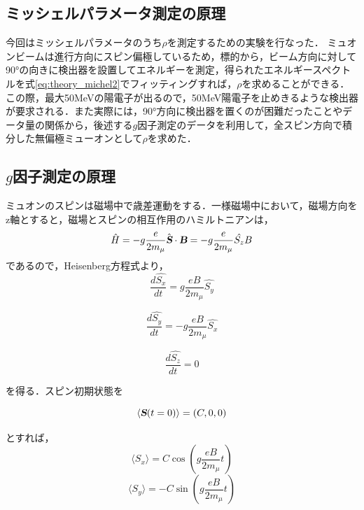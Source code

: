 \subsection{ミッシェルパラメータ測定の原理}
	今回はミッシェルパラメータのうち$\rho$を測定するための実験を行なった．
ミュオンビームは進行方向にスピン偏極しているため，標的から，ビーム方向に対して90°の向きに検出器を設置してエネルギーを測定，得られたエネルギースペクトルを式\eqref{eq:theory_michel2}でフィッティングすれば，$\rho$を求めることができる．この際，最大50MeVの陽電子が出るので，50MeV陽電子を止めきるような検出器が要求される．また実際には，90°方向に検出器を置くのが困難だったことやデータ量の関係から，後述する$g$因子測定のデータを利用して，全スピン方向で積分した無偏極ミューオンとして$\rho$を求めた．
\subsection{$g$因子測定の原理}
ミュオンのスピンは磁場中で歳差運動をする．一様磁場中において，磁場方向をz軸とすると，磁場とスピンの相互作用のハミルトニアンは，
\begin{equation}
\hat{H} = - g \frac{e}{2m_\mu} \hat {\textsl{\textbf {S}}} \cdot \textsl{\textbf {B}} = - g \frac{e}{2m_\mu}  \hat{S_z} B
\end{equation} 
であるので，Heisenberg方程式より，
\begin{equation}
\frac{d\hat{S_x}}{dt} =  g \frac{eB}{2m_\mu}\hat{S_y} 
\end{equation} 

\begin{equation}
\frac{d\hat{S_y}}{dt} = - g \frac{eB}{2m_\mu}\hat{S_x} 
\end{equation} 

\begin{equation}
\frac{d\hat{S_z}}{dt} = 0 
\end{equation} 

を得る．スピン初期状態を

\begin{equation}
\langle \textsl{\textbf {S}}(t=0)\rangle = (C,0,0)
\end{equation} 

とすれば，
\begin{equation}
\langle S_x \rangle= C\cos{(g\frac{eB}{2m_\mu}t)}
\end{equation}
\begin{equation}
\langle S_y \rangle= -C\sin{(g\frac{eB}{2m_\mu}t)}
\end{equation}

